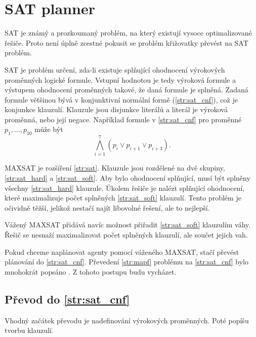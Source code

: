 \section{SAT planner}\label{sec:sat-planner}

%
%

SAT je známý a prozkoumaný problém, na který existují vysoce optimalizované řešiče.
Proto není úplně zcestné pokusit se problém křižovatky převést na SAT problém.

SAT je problém určení, zda-li existuje splňující ohodnocení výrokových proměnných logické formule.
Vstupní hodnotou je tedy výroková formule a výstupem ohodnocení proměnných takové, že daná formule je splněná.
Zadaná formule většinou bývá v konjunktivní normální formě (\ref{str:sat_cnf}), což je konjunkce klauzulí.
Klauzule jsou disjunkce literálů a literál je výroková proměnná, nebo její negace.
Například formule v \ref{str:sat_cnf} pro proměnné $p_1, \dots, p_{10}$ může být
\[
	\bigwedge_{i=1}^{7}(p_i \vee p_{i+1} \vee p_{i + 3}).
\]

MAXSAT je rozšíření \ref{str:sat}.
Klauzule jsou rozdělené na dvě skupiny,
\ref{str:sat_hard} a \ref{str:sat_soft}.
Aby bylo ohodnocení splňující, musí být splněny všechny \ref{str:sat_hard} klauzule.
Úkolem řešiče je nalézt splňující ohodnocení, které maximalizuje počet splněných \ref{str:sat_soft} klauzulí.
Tento problém je očividně těžší, jelikož nestačí najít libovolné řešení, ale to nejlepší.

Vážený MAXSAT přidává navíc možnost přiřadit \ref{str:sat_soft} klauzulím váhy.
Řešič se nesnaží maximalizovat počet splněných klauzulí, ale součet jejich vah.

Pokud chceme naplánovat agenty pomocí váženého MAXSAT, stačí převést plánování do \ref{str:sat_cnf}.
Převedení \ref{str:mapf} problému na \ref{str:sat_cnf} bylo mnohokrát popsáno \citep{bartak}.
Z tohoto postupu budu vycházet.

\subsection{Převod do \ref{str:sat_cnf}}\label{subsec:sat_prevod_do_cnf}

Vhodný začátek převodu je nadefinování výrokových proměnných.
Poté popíšu tvorbu klauzulí.

